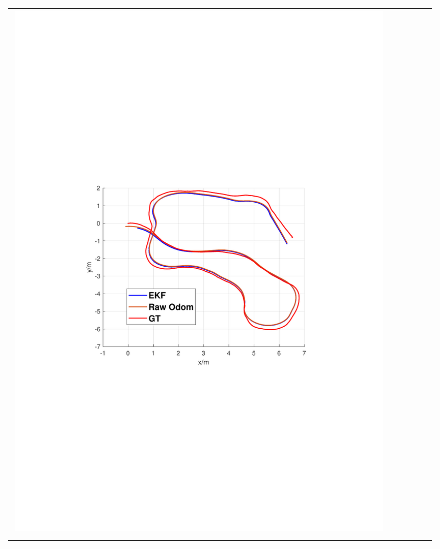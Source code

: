 \documentclass[conference]{IEEEtran}
\begin{document}
\begin{figure}
\begin{center}
\begin{tabular}{cccc}
				\includegraphics[scale=0.26]{fig/oclusion4.pdf} &

\end{tabular}
\end{center}
\end{figure}
\end{document}
